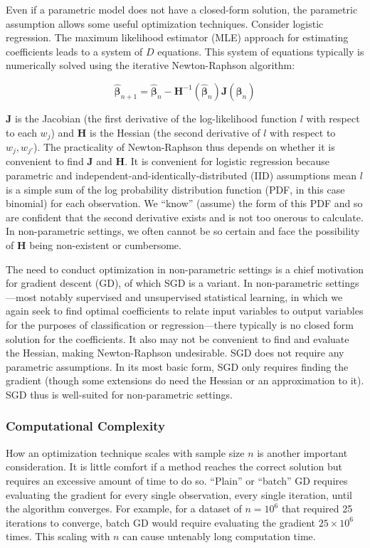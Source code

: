 \documentclass{article}
\begin{document}
Even if a parametric model does not have a closed-form solution, the parametric
assumption allows some useful optimization techniques. Consider logistic
regression. The maximum likelihood estimator (MLE) approach for estimating
coefficients leads to a system of $D$ equations. This system of
equations typically is numerically solved using the iterative Newton-Raphson
algorithm:

$$
\hat{\bm{\beta}}_{n+1} = \hat{\bm{\beta}}_{n} -
\bm{H}^{-1}(\hat{\bm{\beta}}_n)\bm{J}(\hat{\bm{\beta}}_n)
$$

$\bm{J}$ is the Jacobian (the
first derivative of the log-likelihood function $l$ with respect to each $w_j$)
and $\bm{H}$ is the Hessian (the second derivative of $l$ with respect to $w_j,
w_{j'}$). The practicality of Newton-Raphson thus depends on whether it is convenient to
find $\bm{J}$ and $\bm{H}$. It is convenient for logistic regression
because parametric and independent-and-identically-distributed (IID) assumptions
mean $l$ is a simple sum of the log probability distribution
function (PDF, in this case binomial) for each observation. We ``know'' (assume)
the form of this PDF and so are
confident that the second derivative exists and is not too onerous to calculate.
In non-parametric settings, we often cannot be so certain and face the possibility of
$\bm{H}$ being non-existent or cumbersome.

The need to conduct optimization in non-parametric settings is a chief
motivation for gradient descent (GD), of which SGD is a variant. In
non-parametric settings---most notably supervised and unsupervised statistical
learning, in which we again seek to find optimal coefficients to relate input
variables to output variables for the purposes of classification or regression---there 
typically is no closed form solution for the coefficients. It
also may not be convenient to find and evaluate the Hessian, making
Newton-Raphson undesirable. SGD does not require any parametric assumptions. 
In its most basic form, SGD only requires finding the gradient (though some extensions
do need the Hessian or an approximation to it). 
SGD thus is well-suited for non-parametric settings.

\subsubsection{Computational Complexity}

How an optimization technique scales with sample size $n$ is another important
consideration. It is little comfort if a method reaches the correct solution but
requires an excessive amount of time to do so. ``Plain'' or
``batch'' GD requires evaluating the gradient for every single observation,
every single iteration, until the algorithm converges. For example, for a
dataset of $n=10^6$ that required 25 iterations to converge, batch GD would require 
evaluating the gradient $25 \times 10^6$ times. This scaling with
$n$ can cause untenably long computation time.
\end{document}
